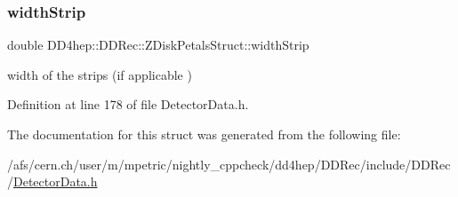 \subsubsection{\texorpdfstring{width\+Strip}{widthStrip}}
{\footnotesize\ttfamily double D\+D4hep\+::\+D\+D\+Rec\+::\+Z\+Disk\+Petals\+Struct\+::width\+Strip}



width of the strips (if applicable ) 



Definition at line 178 of file Detector\+Data.\+h.



The documentation for this struct was generated from the following file\+:\begin{DoxyCompactItemize}
\item 
/afs/cern.\+ch/user/m/mpetric/nightly\+\_\+cppcheck/dd4hep/\+D\+D\+Rec/include/\+D\+D\+Rec/\hyperlink{_detector_data_8h}{Detector\+Data.\+h}\end{DoxyCompactItemize}
